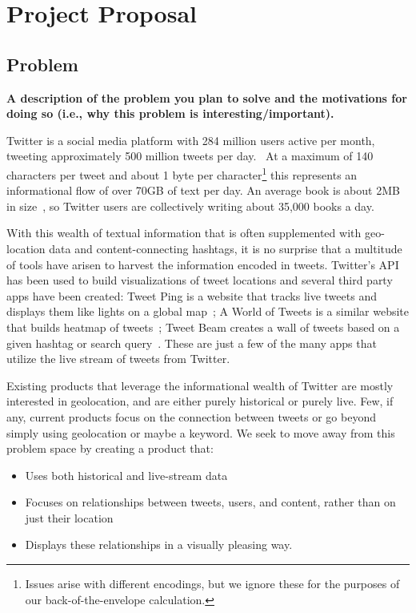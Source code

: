 \section{Project Proposal}

\subsection{Problem}
\textbf{A description of the problem you plan to solve and the motivations for doing so (i.e., why this problem is interesting/important).}

Twitter is a social media platform with 284 million users active per month, tweeting approximately 500 million tweets
per day.~\cite{twitter} At a maximum of 140 characters per tweet and about 1 byte per character\footnote{Issues arise with different
encodings, but we ignore these for the purposes of our back-of-the-envelope calculation.} this represents an informational
flow of over 70GB of text per day. An average book is about 2MB in size~\cite{bookfact}, so Twitter users are collectively
writing about 35,000 books a day.

With this wealth of textual information that is often supplemented with geo-location data and content-connecting hashtags,
it is no surprise that a multitude of tools have arisen to harvest the information encoded in tweets. Twitter's
API~\cite{twitterAPI} has been used to build visualizations of tweet locations and several third party apps
have been created: Tweet Ping is a website that tracks live tweets and displays them like lights on a global
map~\cite{tweetping1, tweetping2}; A World of Tweets is a similar website that builds  heatmap of tweets~\cite{worldoftweets}; Tweet Beam
creates a wall of tweets based on a given hashtag or search query~\cite{tweetbeam}. These are just a few of the many apps that
utilize the live stream of tweets from Twitter.

Existing products that leverage the informational wealth of Twitter are mostly interested in geolocation, and are either
purely historical or purely live. Few, if any, current products focus on the connection between tweets or go beyond
simply using geolocation or maybe a keyword. We seek to move away from this problem space by creating a product that:
\begin{itemize}[noitemsep]
\item Uses both historical and live-stream data
\item Focuses on relationships between tweets, users, and content, rather than on just their location
\item Displays these relationships in a visually pleasing way.
\end{itemize}

